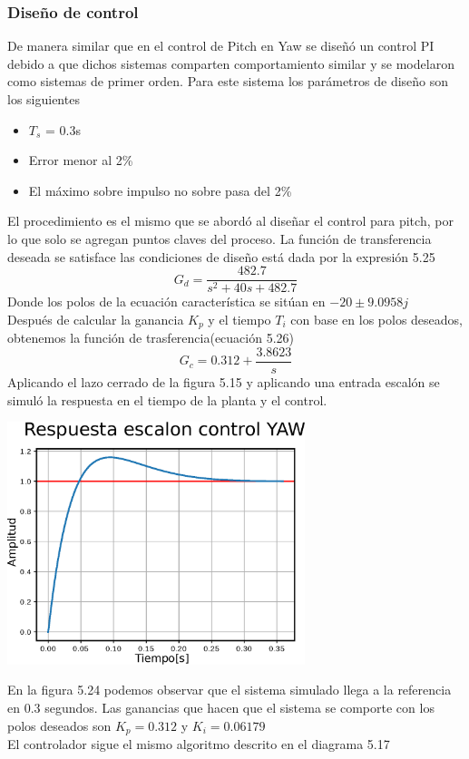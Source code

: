 \subsubsection{Diseño de control}
De manera similar que en el control de Pitch en Yaw se diseñó un control PI debido a que dichos sistemas comparten comportamiento similar y se modelaron como sistemas de primer orden.
Para este sistema los parámetros de diseño son los siguientes
\begin{itemize}
	\item $T_s$ = 0.3s
	\item Error menor al 2\%
	\item El máximo sobre impulso no sobre pasa del 2\%
\end{itemize}
El procedimiento es el mismo que se abordó al diseñar el control para pitch, por lo que solo se agregan puntos claves del proceso.
La función de transferencia deseada se satisface las condiciones de diseño está dada por la expresión 5.25
\begin{equation}
	G_d = \frac{482.7}{s^2 + 40s + 482.7}
\end{equation}
Donde los polos de la ecuación característica se sitúan en $-20 \pm 9.0958j$\\
Después de calcular la ganancia $K_p$ y el tiempo $T_i$ con base en los polos deseados, obtenemos la función de trasferencia(ecuación 5.26)
\begin{equation}
	G_c = 0.312 + \frac{3.8623}{s}
\end{equation}
Aplicando el lazo cerrado de la figura 5.15 y aplicando una entrada escalón se simuló la respuesta en el tiempo de la planta y el control.
\begin{center}
	\includegraphics[width=0.65\textwidth]{Contenido/Cuerpo/Capitulo5/Fig40.eps}
	\label{Fig4}
\end{center}
En la figura 5.24 podemos observar que el sistema simulado llega a la referencia en 0.3 segundos. Las ganancias que hacen que el sistema se comporte con los polos deseados son
$K_p = 0.312$ y $K_i = 0.06179$\\
El controlador sigue el mismo algoritmo descrito en el diagrama 5.17
